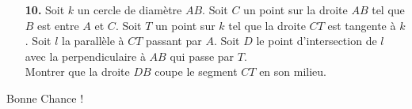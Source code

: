 \documentclass[11pt,a4paper]{article}
\theoremstyle{plain}
\theoremstyle{definition}
\begin{document}
\begin{enumerate}
\bigskip

\item[\textbf{10.}] 
Soit $k$ un cercle de diamètre $AB$. Soit $C$ un point sur la droite $AB$ tel que $B$ est entre $A$ et $C$. Soit $T$ un point sur $k$ tel que la droite $CT$ est tangente à $k$. Soit $l$ la parallèle à $CT$ passant par $A$. Soit $D$ le point d'intersection de $l$ avec la perpendiculaire à $AB$ qui passe par $T$.\\
Montrer que la droite $DB$ coupe le segment $CT$ en son milieu.

\end{enumerate}
\bigskip
\begin{center}
Bonne Chance !
\end{center}
\end{document}

